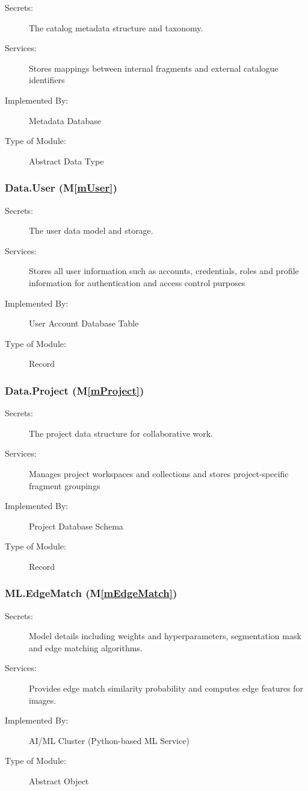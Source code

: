 \documentclass[12pt, titlepage]{article}
\newcommand{\mref}[1]{M\ref{#1}}
\begin{document}
\begin{description}
\item[Secrets:] The catalog metadata structure and taxonomy.
\item[Services:] Stores mappings between internal fragments and external catalogue identifiers
\item[Implemented By:] Metadata Database
\item[Type of Module:] Abstract Data Type
\end{description}

\subsubsection{Data.User (\mref{mUser})}

\begin{description}
\item[Secrets:] The user data model and storage.
\item[Services:] Stores all user information such as accounts, credentials, roles and profile information for authentication and access control purposes
\item[Implemented By:] User Account Database Table
\item[Type of Module:] Record
\end{description}

\subsubsection{Data.Project (\mref{mProject})}

\begin{description}
\item[Secrets:] The project data structure for collaborative work.
\item[Services:] Manages project workspaces and collections and stores project-specific fragment groupings
\item[Implemented By:] Project Database Schema
\item[Type of Module:] Record
\end{description}

\subsubsection{ML.EdgeMatch (\mref{mEdgeMatch})}

\begin{description}
\item[Secrets:] Model details including weights and hyperparameters, segmentation mask and edge matching algorithms.
\item[Services:] Provides edge match similarity probability and computes edge features for images.
\item[Implemented By:] AI/ML Cluster (Python-based ML Service)
\item[Type of Module:] Abstract Object
\end{description}
\end{document}

